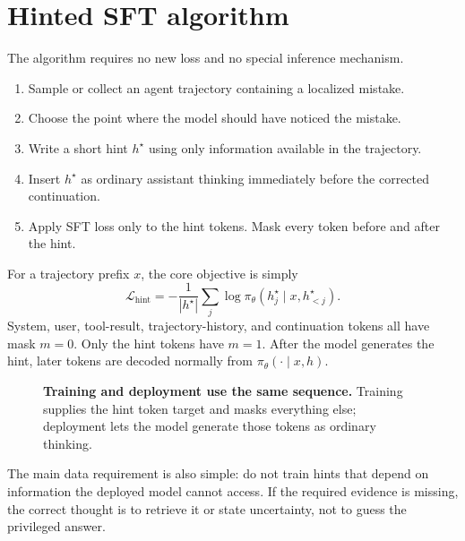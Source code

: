 \section{Hinted SFT algorithm}

The algorithm requires no new loss and no special inference mechanism.

\begin{enumerate}
  \item Sample or collect an agent trajectory containing a localized mistake.
  \item Choose the point where the model should have noticed the mistake.
  \item Write a short hint $h^\star$ using only information available in the trajectory.
  \item Insert $h^\star$ as ordinary assistant thinking immediately before the corrected
  continuation.
  \item Apply SFT loss only to the hint tokens. Mask every token before and after the hint.
\end{enumerate}

For a trajectory prefix $x$, the core objective is simply
\[
  \mathcal L_{\mathrm{hint}}
  =-\frac{1}{|h^\star|}\sum_j
    \log \pi_\theta(h^\star_j\mid x,h^\star_{<j}).
\]
System, user, tool-result, trajectory-history, and continuation tokens all have mask
$m=0$. Only the hint tokens have $m=1$. After the model generates the hint, later tokens
are decoded normally from
$\pi_\theta(\cdot\mid x,h)$.

\begin{figure}[ht]
  \centering
  \caption{\textbf{Training and deployment use the same sequence.} Training supplies the
  hint token target and masks everything else; deployment lets the model generate those
  tokens as ordinary thinking.}
\end{figure}

The main data requirement is also simple: do not train hints that depend on information
the deployed model cannot access. If the required evidence is missing, the correct thought
is to retrieve it or state uncertainty, not to guess the privileged answer.
